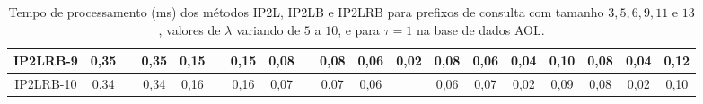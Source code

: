 \begin{table}[h]
{\begin{tabular}{c|c|c|c|c|c|c|c|c|c|c|c|c|c|c|c|c|c|c|}
\multicolumn{1}{|c|}{IP2LRB-9} & {\color[HTML]{656565} 0,35} & {\color[HTML]{656565} } & 0,35 & {\color[HTML]{656565} 0,15} & {\color[HTML]{656565} } & 0,15 & {\color[HTML]{656565} 0,08} & {\color[HTML]{656565} } & 0,08 & {\color[HTML]{656565} 0,06} & {\color[HTML]{656565} 0,02} & 0,08 & {\color[HTML]{656565} 0,06} & {\color[HTML]{656565} 0,04} & 0,10 & {\color[HTML]{656565} 0,08} & {\color[HTML]{656565} 0,04} & 0,12 \\ \hline
\multicolumn{1}{|c|}{IP2LRB-10} & {\color[HTML]{656565} 0,34} & {\color[HTML]{656565} } & 0,34 & {\color[HTML]{656565} 0,16} & {\color[HTML]{656565} } & 0,16 & {\color[HTML]{656565} 0,07} & {\color[HTML]{656565} } & 0,07 & {\color[HTML]{656565} 0,06} & {\color[HTML]{656565} } & 0,06 & {\color[HTML]{656565} 0,07} & {\color[HTML]{656565} 0,02} & 0,09 & {\color[HTML]{656565} 0,08} & {\color[HTML]{656565} 0,02} & 0,10 \\ \hline
\end{tabular}%
}
\caption{Tempo de processamento (ms) dos métodos IP2L, IP2LB e IP2LRB para prefixos de consulta com tamanho $3,5,6,9,11$ e $13$, valores de $\lambda$ variando de $5$ a $10$, e para $\tau=1$ na base de dados AOL.}
\label{tab:methods-processing-time-tau-1-AOL}
\end{table}

